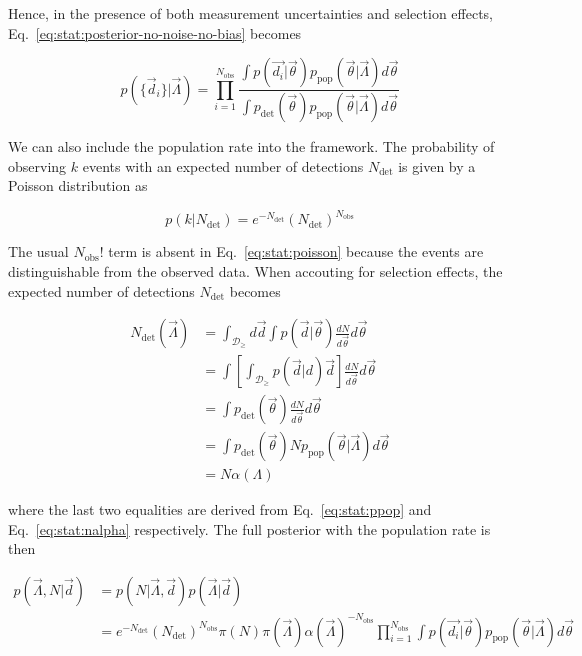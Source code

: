 \documentclass[%
preprint,
nofootinbib,
 amsmath,amssymb,
 aps,
]{revtex4-2}
\newcommand{\given}[2]{p( #1 | #2 )}
\newcommand{\ppop}[0]{p_{\text{pop}}}
\newcommand{\pdet}[0]{p_{\text{det}}}
\newcommand{\ndet}[0]{N_{\text{det}}}
\newcommand{\nobs}[0]{N_{\text{obs}}}
\begin{document}
Hence, in the presence of both measurement uncertainties and selection effects,
Eq.~\eqref{eq:stat:posterior-no-noise-no-bias} becomes

\begin{equation}
	\given{\{ \vec{d}_i \}}{\vec{\Lambda}} =
	\prod_{i=1}^{\nobs}
	\frac{\int \given{\vec{d_i}}{\vec{\theta}} \ppop(\vec{\theta} | \vec{\Lambda} ) d\vec{\theta}}{\int \pdet(\vec{\theta}) \ppop(\vec{\theta} | \vec{\Lambda} ) d\vec{\theta}}
\end{equation}

We can also include the population rate into the framework. The probability of observing $k$ events
with an expected number of detections $\ndet$ is given by a Poisson distribution as

\begin{equation}
	\label{eq:stat:poisson}
	\given{k}{\ndet} = e^{-\ndet}(\ndet)^{\nobs}
\end{equation}

The usual $\nobs !$ term is absent in Eq.~\eqref{eq:stat:poisson} because the events are
distinguishable from the observed data. When accouting for selection effects, the expected number
of detections $\ndet$ becomes

\begin{align}
	\ndet(\vec{\Lambda}) & = \int_{\mathcal{D}_\geq}  d\vec{d} \int \given{\vec{d}}{\vec{\theta}} \frac{dN}{d\vec{\theta}} d\vec{\theta} \\
	                     & = \int \left[ \int_{\mathcal{D}_\geq} \given{\vec{d}} d\vec{d} \right]\frac{dN}{d\vec{\theta}} d\vec{\theta}  \\
	                     & = \int \pdet(\vec{\theta})\frac{dN}{d\vec{\theta}} d\vec{\theta}                                              \\
	                     & = \int \pdet(\vec{\theta}) N \ppop(\vec{\theta} | \vec{\Lambda}) d\vec{\theta}                                \\
	                     & = N \alpha(\Lambda)
\end{align}

where the last two equalities are derived from Eq.~\eqref{eq:stat:ppop} and
Eq.~\eqref{eq:stat:nalpha} respectively. The full posterior with the population rate is then

\begin{align}
	\nonumber
	\given{\vec{\Lambda}, N }{\vec{d}} & = \given{N}{\vec{\Lambda}, \vec{d}}\given{\vec{\Lambda}}{\vec{d}}                    \\
	\label{eq:stat:full-hierarchical-posterior}
	                                   & = e^{-\ndet}(\ndet)^{\nobs} \pi(N) \pi(\vec{\Lambda}) \alpha(\vec{\Lambda})^{-\nobs}
	\prod_{i=1}^{\nobs} \int \given{\vec{d_i}}{\vec{\theta}} \ppop(\vec{\theta} | \vec{\Lambda} ) d\vec{\theta}
\end{align}
\end{document}
